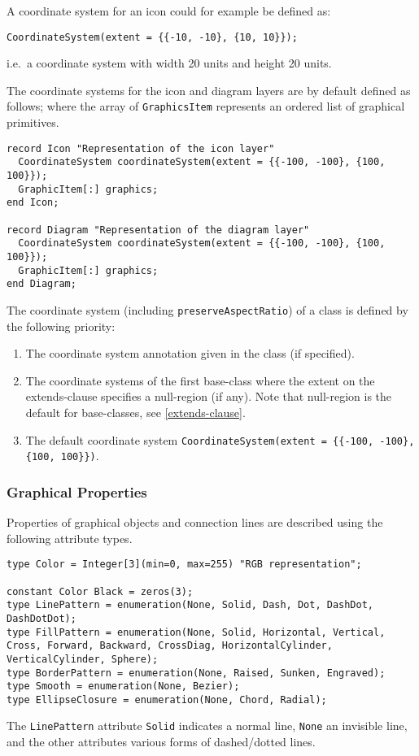 \begin{example}
A coordinate system for an icon could for example be defined as:
\begin{lstlisting}[language=modelica]
CoordinateSystem(extent = {{-10, -10}, {10, 10}});
\end{lstlisting}
i.e.\ a coordinate system with width 20 units and height 20 units.
\end{example}

The coordinate systems for the icon and diagram layers are by default
defined as follows; where the array of \lstinline!GraphicsItem! represents an
ordered list of graphical primitives.

\begin{lstlisting}[language=modelica]
record Icon "Representation of the icon layer"
  CoordinateSystem coordinateSystem(extent = {{-100, -100}, {100, 100}});
  GraphicItem[:] graphics;
end Icon;

record Diagram "Representation of the diagram layer"
  CoordinateSystem coordinateSystem(extent = {{-100, -100}, {100, 100}});
  GraphicItem[:] graphics;
end Diagram;
\end{lstlisting}
The coordinate system (including \lstinline!preserveAspectRatio!) of a class is defined by the following priority:
\begin{enumerate}
\item
  The coordinate system annotation given in the class (if specified).
\item
  The coordinate systems of the first base-class where the extent on the
  extends-clause specifies a null-region (if any). Note that null-region
  is the default for base-classes, see \cref{extends-clause}.
\item
  The default coordinate system \lstinline!CoordinateSystem(extent = {{-100, -100}, {100, 100}})!.
\end{enumerate}

\subsubsection{Graphical Properties}\label{graphical-properties}

Properties of graphical objects and connection lines are described using
the following attribute types.
\begin{lstlisting}[language=modelica]
type Color = Integer[3](min=0, max=255) "RGB representation";

constant Color Black = zeros(3);
type LinePattern = enumeration(None, Solid, Dash, Dot, DashDot, DashDotDot);
type FillPattern = enumeration(None, Solid, Horizontal, Vertical,
Cross, Forward, Backward, CrossDiag, HorizontalCylinder, VerticalCylinder, Sphere);
type BorderPattern = enumeration(None, Raised, Sunken, Engraved);
type Smooth = enumeration(None, Bezier);
type EllipseClosure = enumeration(None, Chord, Radial);
\end{lstlisting}
The \lstinline!LinePattern! attribute \lstinline!Solid! indicates a normal line, \lstinline!None! an
invisible line, and the other attributes various forms of dashed/dotted
lines.

